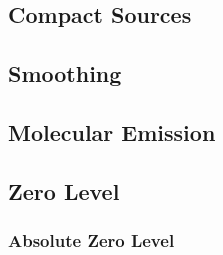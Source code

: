 \documentclass{emulateapj}
\begin{document}
\subsection{Compact Sources}
\label{sec:ptsrc}

\subsection{Smoothing}
\label{sec:smth}

\subsection{Molecular Emission}
\label{sec:mole}

\subsection{Zero Level}
\label{sec:zp}

\subsubsection{Absolute Zero Level}
\label{sec:zp_abs}
\end{document}
